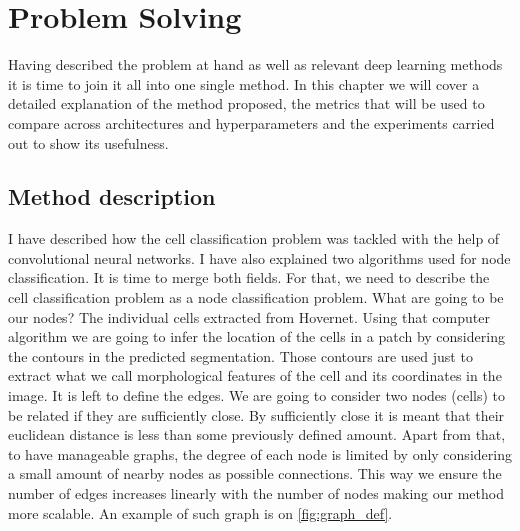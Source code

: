\chapter{Problem Solving}

Having described the problem at hand as well as relevant deep learning methods it is time to join it all into one single method. In this chapter we will cover a detailed explanation of the method proposed, the metrics that will be used to compare across architectures and hyperparameters and the experiments carried out to show its usefulness.

\section{Method description}\label{sec:descr}

I have described how the cell classification problem was tackled with the help of convolutional neural networks. I have also explained two algorithms used for node classification. It is time to merge both fields. For that, we need to describe the cell classification problem as a node classification problem. What are going to be our nodes? The individual cells extracted from Hovernet. Using that computer algorithm we are going to infer the location of the cells in a patch by considering the contours in the predicted segmentation. Those contours are used just to extract what we call morphological features of the cell and its coordinates in the image. It is left to define the edges. We are going to consider two nodes (cells) to be related if they are sufficiently close. By sufficiently close it is meant that their euclidean distance is less than some previously defined amount. Apart from that, to have manageable graphs, the degree of each node is limited by only considering a small amount of nearby nodes as possible connections. This way we ensure the number of edges increases linearly with the number of nodes making our method more scalable. An example of such graph is on \autoref{fig:graph_def}. 

